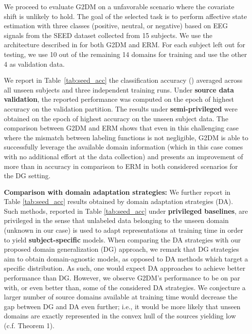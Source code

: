 \documentclass{article}
\begin{document}
We proceed to evaluate G2DM on a unfavorable scenario where the covariate shift is unlikely to hold. The goal of the selected task is to perform affective state estimation with three classes (positive, neutral, or negative) based on EEG signals from the SEED dataset \cite{zheng2015investigating} collected from 15 subjects. We use the architecture described in \cite{li2017targeting} for both G2DM and ERM. For each subject left out for testing, we use 10 out of the remaining 14 domains for training and use the other 4 as validation data.

We report in Table~\ref{tab:seed_acc} the classification accuracy () averaged across all unseen subjects and three independent training runs. Under \textbf{source data validation}, the reported performance was computed on the epoch of highest accuracy on the validation partition. The results under \textbf{semi-privileged} were obtained on the epoch of highest accuracy on the unseen subject data. The comparison between G2DM and ERM shows that even in this challenging case where the mismatch between labeling functions is not negligible, G2DM is able to successfully leverage the available domain information (which in this case comes with no additional effort at the data collection) and presents an improvement of more than  in accuracy in comparison to ERM in both considered scenarios for the DG setting. 

\textbf{Comparison with domain adaptation strategies:} We further report in Table \ref{tab:seed_acc} results obtained by domain adaptation strategies (DA). Such methods, reported in Table \ref{tab:seed_acc} under \textbf{privileged baselines}, are privileged in the sense that unlabeled data belonging to the unseen domain (unknown in our case) is used to adapt representations at training time in order to yield \textbf{subject-specific} models. When comparing the DA strategies with our proposed domain generalization (DG) approach, we remark that DG strategies aim to obtain domain-agnostic models, as opposed to DA methods which target a specific distribution. As such, one would expect DA approaches to achieve better performance than DG. However, we observe G2DM's performance to be on par with, or even better than, some of the considered DA strategies. We conjecture a larger number of source domains available at training time would decrease the gap between DG and DA even further; i.e., it would be more likely that unseen domains are exactly represented in the convex hull of the sources yielding low  (c.f. Theorem 1).
\end{document}
